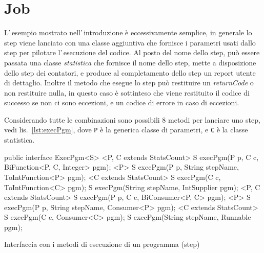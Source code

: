 \chapter{Job}

L'\,esempio mostrato nell'\,introduzione è eccessivamente semplice, in generale
lo step viene lanciato con una classe aggiuntiva che fornisce i parametri usati
dallo step per pilotare l'\,esecuzione del codice.
Al posto del nome dello step, può essere passata una classe \textsl{statistica}
che fornisce il nome dello step, mette a disposizione dello step dei contatori,
e produce al completamento dello step un report utente di dettaglio.
Inoltre il metodo che esegue lo step può restituire un \textsl{returnCode} o
non restituire nulla, in questo caso è sottinteso che viene restituito il codice
di successo se non ci sono eccezioni, e un codice di errore in caso di
eccezioni.

Considerando tutte le combinazioni sono possibili 8 metodi per lanciare uno
step, vedi lis.~\ref{lst:execPgm}, dove \texttt{P} è la generica classe di
parametri, e \texttt{C} è la classe statistica.
\begin{elisting}[!htb]
    \begin{javacode}
        public interface ExecPgm<S> {
    <P, C extends StatsCount> S execPgm(P p, C c, BiFunction<P, C, Integer> pgm);
    <P> S execPgm(P p, String stepName, ToIntFunction<P> pgm);
    <C extends StatsCount> S execPgm(C c, ToIntFunction<C> pgm);
    S execPgm(String stepName, IntSupplier pgm);
    <P, C extends StatsCount> S execPgm(P p, C c, BiConsumer<P, C> pgm);
    <P> S execPgm(P p, String stepName, Consumer<P> pgm);
    <C extends StatsCount> S execPgm(C c, Consumer<C> pgm);
    S execPgm(String stepName, Runnable pgm);
}
    \end{javacode}
    \caption{Interfaccia con i metodi di esecuzione di un programma (step)}
    \label{lst:execPgm}
\end{elisting}

